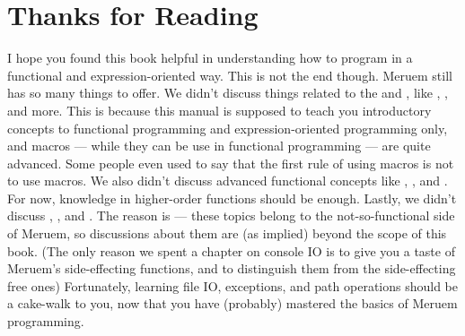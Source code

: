 \section{Thanks for Reading}
I hope you found this book helpful in understanding how to program in a functional and expression-oriented way. This is not the end though. Meruem still has so many things to offer. We didn't discuss things related to the  and , like , ,  and more. This is because this manual is supposed to teach you introductory concepts to functional programming and expression-oriented programming only, and macros --- while they can be use in functional programming --- are quite advanced. Some people even used to say that the first rule of using macros is not to use macros. We also didn't discuss advanced functional concepts like , , and . For now, knowledge in higher-order functions should be enough. Lastly, we didn't discuss , , and . The reason is --- these topics belong to the not-so-functional side of Meruem, so discussions about them are (as implied) beyond the scope of this book. (The only reason we spent a chapter on console IO is to give you a taste of Meruem's side-effecting functions, and to distinguish them from the side-effecting free ones) Fortunately, learning file IO, exceptions, and path operations should be a cake-walk to you, now that you have (probably) mastered the basics of Meruem programming.